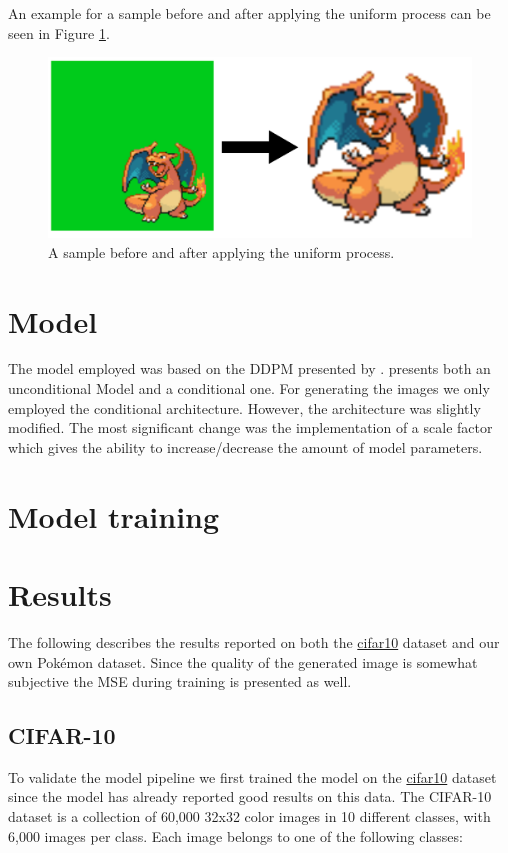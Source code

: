 \documentclass[12pt]{article}
\theoremstyle{plain}
\theoremstyle{definition}
\theoremstyle{remark}
\begin{document}
An example for a sample before and after applying the uniform process can be seen in Figure \ref{fig:preprocessingpipeline}.

\begin{figure}[h]
	\centering
	\includegraphics[width=0.5\linewidth]{src/Images/preprocessing_pipeline}
	\caption[Before and After Uniform Process]{A sample before and after applying the uniform process.}
	\label{fig:preprocessingpipeline}
\end{figure}

%
\section{Model}
\label{sec:model}
The model employed was based on the \ac{DDPM} presented by \cite{Ho2020}. \cite{Ho2020} presents both an unconditional Model and a conditional one. For generating the images we only employed the conditional architecture. However, the architecture was slightly modified. The most significant change was the implementation of a scale factor which gives the ability to increase/decrease the amount of model parameters. 

\section{Model training}
\label{sec:model_training}

\section{Results}\label{sec:results}
The following describes the results reported on both the \href{https://www.cs.toronto.edu/~kriz/cifar.html}{cifar10} dataset and our own Pokémon dataset. Since the quality of the generated image is somewhat subjective the \ac{MSE} during training is presented as well. 


\subsection{CIFAR-10}
To validate the model pipeline we first trained the model on the \href{https://www.cs.toronto.edu/~kriz/cifar.html}{cifar10} dataset since the model has already reported good results on this data. The CIFAR-10 dataset is a collection of 60,000 32x32 color images in 10 different classes, with 6,000 images per class. Each image belongs to one of the following classes:
\end{document}
